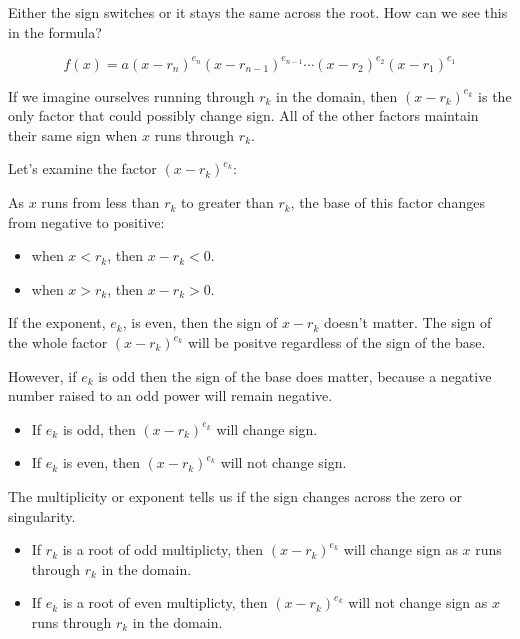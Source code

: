 \documentclass{ximera}
\begin{document}
Either the sign switches or it stays the same across the root.  How can we see this in the formula?



\[   f(x) = a (x-r_n)^{e_n} (x-r_{n-1})^{e_{n-1}}  \cdots (x-r_2)^{e_2} (x-r_1)^{e_1}  \]


If we imagine ourselves running through $r_k$ in the domain, then $(x-r_k)^{e_k}$ is the only factor that could possibly change sign.  All of the other factors maintain their same sign when $x$ runs through $r_k$.



Let's examine the factor $(x-r_k)^{e_k}$:

As $x$ runs from less than $r_k$ to greater than $r_k$, the base of this factor changes from negative to positive:

\begin{itemize}
\item when $x<r_k$, then $x-r_k <0$.  \\

\item when $x>r_k$, then $x-r_k >0$. \\
\end{itemize}


If the exponent, $e_k$, is even, then the sign of $x-r_k$ doesn't matter. The sign of the whole factor $(x-r_k)^{e_k}$ will be positve regardless of the sign of the base.

However, if $e_k$ is odd then the sign of the base does matter, because a negative number raised to an odd power will remain negative.





\begin{itemize}
\item If $e_k$ is odd, then $(x-r_k)^{e_k}$ will change sign.
\item If $e_k$ is even, then $(x-r_k)^{e_k}$ will not change sign.
\end{itemize}




The multiplicity or exponent tells us if the sign changes across the zero or singularity.


\begin{itemize}
\item If $r_k$ is a root of odd multiplicty, then $(x-r_k)^{e_k}$ will change sign as $x$ runs through $r_k$ in the domain.
\item If $e_k$ is a root of even multiplicty, then $(x-r_k)^{e_k}$ will not change sign as $x$ runs through $r_k$ in the domain.
\end{itemize}
\end{document}

